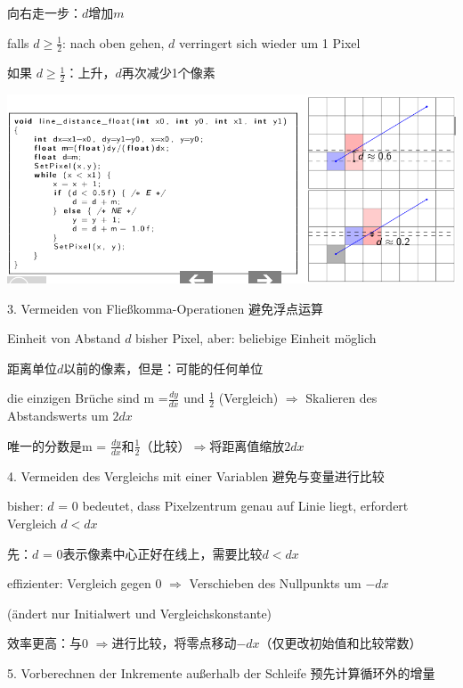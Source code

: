 \documentclass[fleqn]{article}
\begin{document}
\indent\indent 向右走一步：$ d $增加$ m $

\indent\indent falls $d\geq\frac{1}{2}$: nach oben gehen, $d$ verringert sich wieder um 1 Pixel

\indent\indent 如果 $ d\geq \frac {1} {2} $：上升，$ d $再次减少1个像素

\begin{center}
    \includegraphics[scale=0.45]{3.png}
\end{center}

3. Vermeiden von Fließkomma-Operationen 避免浮点运算

\indent\indent Einheit von Abstand $d$ bisher Pixel, aber: beliebige Einheit möglich

\indent\indent 距离单位$ d $以前的像素，但是：可能的任何单位

\indent\indent die einzigen Brüche sind m =$\frac{dy}{dx}$ und $\frac{1}{2}$ (Vergleich) $\Rightarrow$ Skalieren des Abstandswerts um $2dx$

\indent\indent 唯一的分数是m = $ \frac {dy} {dx} $和$ \frac {1} {2} $（比较）$ \Rightarrow $将距离值缩放$ 2dx $

4. Vermeiden des Vergleichs mit einer Variablen 避免与变量进行比较

\indent\indent bisher: $d$ = 0 bedeutet, dass Pixelzentrum genau auf Linie liegt, erfordert Vergleich $d < dx$

\indent\indent 先：$ d $ = 0表示像素中心正好在线上，需要比较$ d <dx $

\indent\indent effizienter: Vergleich gegen 0 $\Rightarrow$ Verschieben des Nullpunkts um $−dx$ 

\indent\indent\indent (ändert nur Initialwert und Vergleichskonstante)

\indent\indent 效率更高：与0 $ \Rightarrow $进行比较，将零点移动$ -dx $（仅更改初始值和比较常数）

5. Vorberechnen der Inkremente außerhalb der Schleife 预先计算循环外的增量
\end{document}
